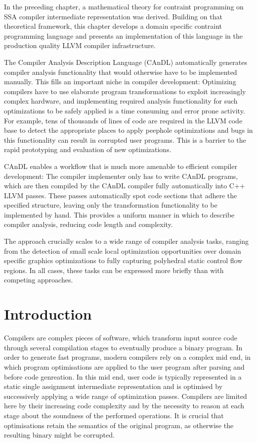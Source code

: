 
    In the preceding chapter, a mathematical theory for contraint programming on
    SSA compiler intermediate representation was derived.
    Building on that theoretical framework, this chapter develops a
    domain specific contraint programming language and presents an
    implementation of this language in the production quality LLVM compiler
    infrastructure.

    The Compiler Analysis Description Language (CAnDL) automatically generates
    compiler analysis functionality that would otherwise have to be implemented
    manually.
    This fills an important niche in compiler development:
    Optimizing compilers have to use elaborate program transformations to exploit
    increasingly complex hardware, and implementing required analysis
    functionality for such optimizations to be safely applied is a time
    consuming and error prone activity.
    For example, tens of thousands of lines of code are required in the LLVM
    code base to detect the appropriate places to apply peephole optimizations
    and bugs in this functionality can result in corrupted user programs.
    This is a barrier to the rapid prototyping and evaluation of new
    optimizations.

    CAnDL enables a workflow that is much more amenable to efficient compiler
    development:
    The compiler implementer only has to write CAnDL programs, which are then
    compiled by the CAnDL compiler fully automatically into C++ LLVM passes.
    These passes automatically spot code sections that adhere the specified
    structure, leaving only the transformation functionality to be implemented
    by hand.
    This provides a uniform manner in which to describe compiler analysis,
    reducing code length and complexity.

    The approach crucially scales to a wide range of compiler analysis tasks,
    ranging from the detection of small scale local optimization opportunities
    over domain specific graphics optimizations to fully capturing polyhedral
    static control flow regions.
    In all cases, these tasks can be  expressed more briefly than with competing
    approaches.

\section{Introduction}

    Compilers are complex pieces of software, which transform input source code
    through several compilation stages to eventually produce a binary program.
    In order to generate fast programs, modern compilers rely on a complex mid
    end, in which program optimisations are applied to the user program after
    parsing and before code genreation.
    In this mid end, user code is typically represented in a static single
    assignment intermediate representation and is optimised by successively
    applying a wide range of optimization passes.
    Compilers are limited here by their increasing code complexity and by the
    necessity to reason at each stage about the soundness of the performed
    operations.
    It is crucial that optimisations retain the semantics of the original
    program, as otherwise the resulting binary might be corrupted.
    


